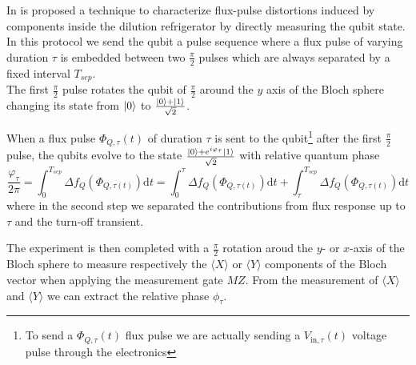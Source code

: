 In \cite{rol_time-domain_2020} is proposed a technique to characterize flux-pulse distortions induced by components inside the dilution refrigerator by directly measuring the qubit state.
In this protocol we send the qubit a pulse sequence where a flux pulse of varying duration $\tau$ is embedded between two $\frac{\pi}{2}$ pulses which are always separated by a fixed interval $T_{sep}$.\\
The first $\frac{\pi}{2}$ pulse rotates the qubit of $\frac{\pi}{2}$ around the $y$ axis of the Bloch sphere changing its state from $\ket{0}$ to $\frac{\ket{0}+\ket{1}}{\sqrt{2}}$.

When a flux pulse $\Phi_{Q,\tau}(t)$ of duration $\tau$ is sent to the qubit\footnote{To send a $\Phi_{Q,\tau}(t)$ flux pulse we are actually sending a $V_{\text{in},\tau}(t)$ voltage pulse through the electronics} after the first $\frac{\pi}{2}$ pulse, the qubits evolve to the state $\frac{\ket{0}+e^{i\varphi_\tau}\ket{1}}{\sqrt{2}}$ with relative quantum phase 
\begin{equation}\label{eq:phi}
    \frac{\varphi_{\tau}}{2\pi} = \int_{0}^{T_{sep}} \Delta f_Q (\Phi_{Q,\tau(t)})\text{d}t = \int_{0}^{\tau} \Delta f_Q (\Phi_{Q,\tau(t)})\text{d}t + \int_{\tau}^{T_{sep}} \Delta f_Q (\Phi_{Q,\tau(t)})\text{d}t
\end{equation}
where in the second step we separated the contributions from flux response up to $\tau$ and the turn-off transient. 

The experiment is then completed with a $\frac{\pi}{2}$ rotation aroud the $y$- or $x$-axis of the Bloch sphere to measure respectively the $\langle X \rangle$ or $\langle Y \rangle$ components of the Bloch vector when applying the measurement gate $MZ$. 
From the measurement of $\langle X \rangle$ and $\langle Y \rangle$ we can extract the relative phase $\phi_{\tau}$.\\

